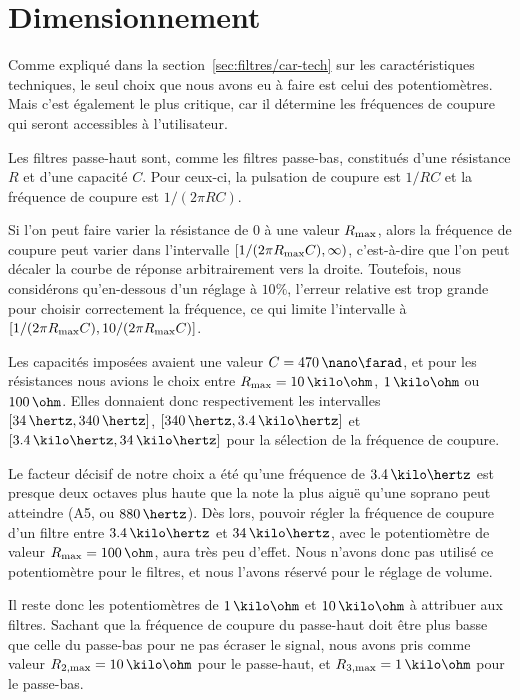 \section{Dimensionnement}
\label{sec:filtres/dimens}

Comme expliqué dans la section~\ref{sec:filtres/car-tech}
sur les caractéristiques techniques,
le seul choix que nous avons eu à faire est celui des potentiomètres.
Mais c'est également le plus critique, car
il détermine les fréquences de coupure qui seront accessibles à l'utilisateur.

Les filtres passe-haut sont, comme les filtres passe-bas,
constitués d'une résistance $R$ et d'une capacité $C$. Pour ceux-ci,
la pulsation de coupure est $1/RC$
et la fréquence de coupure est $1/(2\pi RC)$.

Si l'on peut faire varier la résistance de $0$ à une valeur $R_{\mathrm{max}}$,
alors la fréquence de coupure peut varier dans l'intervalle
$[1/(2\pi R_{\mathrm{max}}C),\infty)$,
c'est-à-dire que l'on peut décaler la courbe
de réponse arbitrairement vers la droite.
Toutefois, nous considérons qu'en-dessous d'un réglage à $10\%$,
l'erreur relative est trop grande pour choisir correctement la fréquence,
ce qui limite l'intervalle à $[1/(2\pi R_{\mathrm{max}}C),10/(2\pi R_{\mathrm{max}}C)]$.

Les capacités imposées avaient une valeur $C=470\,\nano\farad$,
et pour les résistances nous avions le choix entre
$R\ind{max}=10\,\kilo\ohm$, $1\,\kilo\ohm$ ou $100\,\ohm$.
Elles donnaient donc respectivement les intervalles
$[34\,\hertz,340\,\hertz]$, $[340\,\hertz,3.4\,\kilo\hertz]$
et $[3.4\,\kilo\hertz,34\,\kilo\hertz]$
pour la sélection de la fréquence de coupure.

Le facteur décisif de notre choix a été
qu'une fréquence de $3.4\,\kilo\hertz$ est
presque deux octaves plus haute que la note la plus aiguë
qu'une soprano peut atteindre (A5, ou $880\,\hertz$).%
\cite{vocal-ranges}
Dès lors, pouvoir régler la fréquence de coupure d'un filtre
entre $3.4\,\kilo\hertz$ et $34\,\kilo\hertz$,
avec le potentiomètre de valeur $R\ind{max} = 100\,\ohm$, aura très peu d'effet.
Nous n'avons donc pas utilisé ce potentiomètre
pour le filtres, et nous l'avons réservé pour le réglage de volume.

Il reste donc les potentiomètres de $1\,\kilo\ohm$ et $10\,\kilo\ohm$
à attribuer aux filtres.
Sachant que la fréquence de coupure du passe-haut
doit être plus basse que celle du passe-bas pour ne pas écraser le signal,
nous avons pris comme valeur $R\ind{2,max}=10\,\kilo\ohm$ pour le passe-haut,
et $R\ind{3,max}=1\,\kilo\ohm$ pour le passe-bas.
